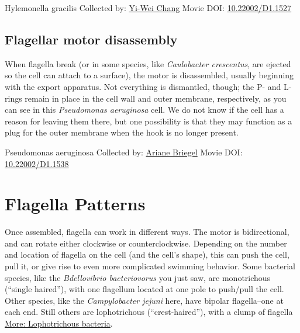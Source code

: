 \documentclass[]{tufte-book}
\begin{document}
\hypertarget{htmlwidget-4c2880034702c05eb156}{}

\label{fig:6-3}Hylemonella gracilis Collected by: \protect\hyperlink{yi-wei_chang}{Yi-Wei Chang} Movie DOI: \href{https://doi.org/10.22002/D1.1527}{10.22002/D1.1527}

\hypertarget{Flagellar_motor_disassembly}{%
\subsection{Flagellar motor disassembly}\label{Flagellar_motor_disassembly}}

When flagella break (or in some species, like \emph{Caulobacter crescentus}, are ejected so the cell can attach to a surface), the motor is disassembled, usually beginning with the export apparatus. Not everything is dismantled, though; the P- and L-rings remain in place in the cell wall and outer membrane, respectively, as you can see in this \emph{Pseudomonas aeruginosa} cell. We do not know if the cell has a reason for leaving them there, but one possibility is that they may function as a plug for the outer membrane when the hook is no longer present.



\hypertarget{htmlwidget-723e6b4c5e96b8c648ba}{}

\label{fig:6-3a}Pseudomonas aeruginosa Collected by: \protect\hyperlink{ariane_briegel}{Ariane Briegel} Movie DOI: \href{https://doi.org/10.22002/D1.1538}{10.22002/D1.1538}

\hypertarget{flagella-patterns}{%
\section{Flagella Patterns}\label{flagella-patterns}}

Once assembled, flagella can work in different ways. The motor is bidirectional, and can rotate either clockwise or counterclockwise. Depending on the number and location of flagella on the cell (and the cell's shape), this can push the cell, pull it, or give rise to even more complicated swimming behavior. Some bacterial species, like the \emph{Bdellovibrio bacteriovorus} you just saw, are monotrichous (``single haired''), with one flagellum located at one pole to push/pull the cell. Other species, like the \emph{Campylobacter jejuni} here, have bipolar flagella--one at each end. Still others are lophotrichous (``crest-haired''), with a clump of flagella \protect\hyperlink{Lophotrichous_bacteria}{More: Lophotrichous bacteria}.
\end{document}

